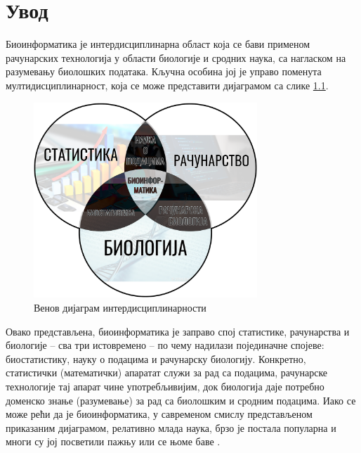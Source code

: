 \documentclass[12pt,oneside]{memoir}
\begin{document}
\frontmatter
\naslovna
\komisija
\apstrakt
\tableofcontents*

\mainmatter

\chapter{Увод}
Биоинформатика је интердисциплинарна област која се бави применом рачунарских технологија у области биологије и сродних наука, са нагласком на разумевању биолошких података. Кључна особина јој је управо поменута мултидисциплинарност, која се може представити дијаграмом са слике \ref{fig:venn}.

\begin{figure}[!ht]
  \centering
  \includegraphics[width=0.75\textwidth]{bioinformatika.png}
  \caption{Венов дијаграм интердисциплинарности\cite{venn}}
  \label{fig:venn}
\end{figure}

Овако представљена, биоинформатика је заправо спој статистике, рачунарства и биологије -- сва три истовремено -- по чему надилази појединачне спојеве: биостатистику, науку о подацима и рачунарску биологију. Конкретно, статистички (математички) апаратат служи за рад са подацима, рачунарске технологије тај апарат чине употребљивијим, док биологија даје потребно доменско знање (разумевање) за рад са биолошким и сродним подацима. Иако се може рећи да је биоинформатика, у савременом смислу представљеном приказаним дијаграмом, релативно млада наука, брзо је постала популарна и многи су јој посветили пажњу или се њоме баве \cite{fauziyyah2019, cmero2015, ufpr}.
\end{document}
